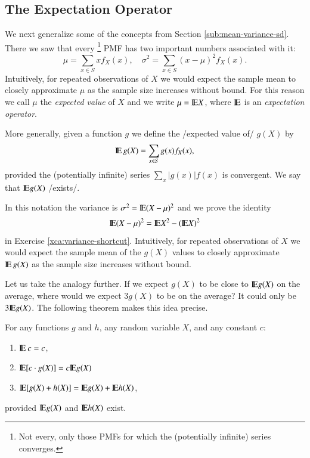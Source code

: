 \documentclass[captions=tableheading]{scrbook}
\begin{document}
\label{sec:expectation-and-mgfs}
\subsection{The Expectation Operator}
\label{sec-1-4-1}

\label{sub:expectation-operator}

We next generalize some of the concepts from Section \ref{sub:mean-variance-sd}. There we saw that every
\footnote{Not every, only those PMFs for which the (potentially infinite) series converges.}
PMF has two important numbers associated with it:
\begin{equation}
\mu=\sum_{x\in S}xf_{X}(x),\quad\sigma^{2}=\sum_{x\in S}(x-\mu)^{2}f_{X}(x).
\end{equation}
Intuitively, for repeated observations of \(X\) we would expect the sample mean to closely approximate \(\mu\) as the sample size increases without bound. For this reason we call \(\mu\) the \emph{expected value} of \(X\) and we write \(\mu=\mathrm{I\hspace{-1.5pt}E} X\), where \(\mathrm{I\hspace{-1.5pt}E}\) is an \emph{expectation operator}.

\begin{defn}
More generally, given a function \(g\) we define the /expected value of/ \(g(X)\) by
\begin{equation}
\mathrm{I\hspace{-1.5pt}E}\, g(X)=\sum_{x\in S}g(x)f_{X}(x),
\end{equation}
provided the (potentially infinite) series \(\sum_{x}|g(x)|f(x)\) is convergent. We say that \(\mathrm{I\hspace{-1.5pt}E} g(X)\) /exists/.
\end{defn}


In this notation the variance is \(\sigma^{2}=\mathrm{I\hspace{-1.5pt}E}(X-\mu)^{2}\) and we prove the identity
\begin{equation}
\mathrm{I\hspace{-1.5pt}E}(X-\mu)^{2}=\mathrm{I\hspace{-1.5pt}E} X^{2}-(\mathrm{I\hspace{-1.5pt}E} X)^{2}
\end{equation}
in Exercise \ref{xca:variance-shortcut}. Intuitively, for repeated observations of \(X\) we would expect the sample mean of the \(g(X)\) values to closely approximate \(\mathrm{I\hspace{-1.5pt}E}\, g(X)\) as the sample size increases without bound.

Let us take the analogy further. If we expect \(g(X)\) to be close to \(\mathrm{I\hspace{-1.5pt}E} g(X)\) on the average, where would we expect \(3g(X)\) to be on the average? It could only be \(3\mathrm{I\hspace{-1.5pt}E} g(X)\). The following theorem makes this idea precise.

\begin{prop}
\label{pro:expectation-properties}
For any functions \(g\) and \(h\), any random variable \(X\), and any constant \(c\): 

\begin{enumerate}
\item \(\mathrm{I\hspace{-1.5pt}E}\: c=c\),
\item \(\mathrm{I\hspace{-1.5pt}E}[c\cdot g(X)]=c\mathrm{I\hspace{-1.5pt}E} g(X)\)
\item \(\mathrm{I\hspace{-1.5pt}E}[g(X)+h(X)]=\mathrm{I\hspace{-1.5pt}E} g(X)+\mathrm{I\hspace{-1.5pt}E} h(X)\),
\end{enumerate}

provided \(\mathrm{I\hspace{-1.5pt}E} g(X)\) and \(\mathrm{I\hspace{-1.5pt}E} h(X)\) exist.

\end{prop}
\end{document}
